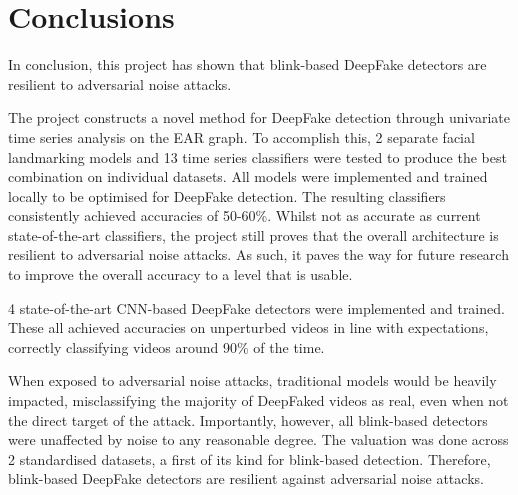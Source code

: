 \chapter{Conclusions}
\label{ch:conclusions}


In conclusion, this project has shown that blink-based DeepFake detectors are resilient to adversarial noise attacks.

The project constructs a novel method for DeepFake detection through univariate time series analysis on the EAR graph. To accomplish this, 2 separate facial landmarking models and 13 time series classifiers were tested to produce the best combination on individual datasets. All models were implemented and trained locally to be optimised for DeepFake detection. The resulting classifiers consistently achieved accuracies of 50-60\%. Whilst not as accurate as current state-of-the-art classifiers, the project still proves that the overall architecture is resilient to adversarial noise attacks. As such, it paves the way for future research to improve the overall accuracy to a level that is usable.

4 state-of-the-art CNN-based DeepFake detectors were implemented and trained. These all achieved accuracies on unperturbed videos in line with expectations, correctly classifying videos around 90\% of the time.

When exposed to adversarial noise attacks, traditional models would be heavily impacted, misclassifying the majority of DeepFaked videos as real, even when not the direct target of the attack. Importantly, however, all blink-based detectors were unaffected by noise to any reasonable degree. The valuation was done across 2 standardised datasets, a first of its kind for blink-based detection. Therefore, blink-based DeepFake detectors are resilient against adversarial noise attacks.


